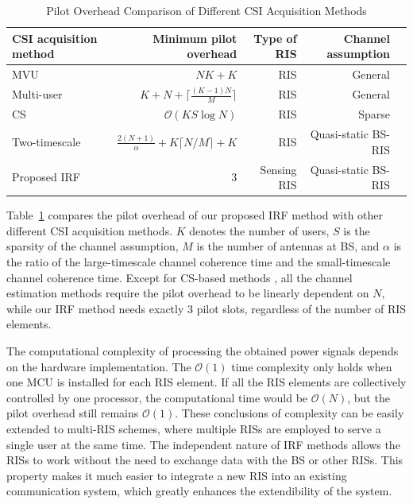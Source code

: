 \documentclass[journal,twocolumn]{IEEEtran}
\theoremstyle{nonumberplain}
\begin{document}
    \begin{table}[t]
        \caption{Pilot Overhead Comparison of Different CSI Acquisition Methods}
        \label{tab:pilot overhead comp CE}
        \centering
        \begin{tabular}{|l|r|r|r|r|}
            \hline 
            CSI acquisition method & Minimum pilot overhead & Type of RIS& Channel assumption\\ 
            \hline
            MVU\cite{jensen2020optimal}         & $NK+K$    &RIS& General  \\
            \hline
            Multi-user\cite{wang2020channel}  & $K+N+ \lceil \frac{(K-1)N}{M} \rceil$ &RIS& General  \\
            \hline
            CS\cite{wei2021channel}          & $\mathcal{O}(KS\log N)$ &RIS& Sparse \\
            \hline 
            Two-timescale\cite{Huchen} & $\frac{2(N+1)}{\alpha} + K\lceil N/M\rceil +K$ &RIS& Quasi-static BS-RIS  \\
            \hline 
            Proposed IRF & 3 & Sensing RIS  & Quasi-static BS-RIS\\ 
            \hline
        \end{tabular}
    \end{table}

    Table~\ref{tab:pilot overhead comp CE} compares the pilot overhead of our proposed IRF method with other different CSI acquisition methods. 
    $K$ denotes the number of users, $S$ is the sparsity of the channel assumption, $M$ is the number of antennas at BS, and $\alpha$ is the ratio of the large-timescale channel  coherence time and the small-timescale channel coherence time\cite{Huchen}. 
    Except for CS-based methods \cite{wei2021channel}, all the channel estimation methods \cite{jensen2020optimal,wang2020channel,Huchen} require the pilot overhead to be linearly dependent on $N$, while our IRF method needs exactly 3 pilot slots, regardless of the number of RIS elements. 

    The computational complexity of processing the obtained power signals depends on the hardware implementation. 
    The $\mathcal{O}(1)$ time complexity only holds when one MCU is installed for each RIS element. 
    If all the RIS elements are collectively controlled by one processor, the computational time would be $\mathcal{O}(N)$, but the pilot overhead still remains $\mathcal{O}(1)$. 
    These conclusions of complexity can be easily extended to multi-RIS schemes, where multiple RISs are employed to serve a single user at the same time. 
    The independent nature of IRF methods allows the RISs to work without the need to exchange data with the BS or other RISs. 
    This property makes it much easier to integrate a new RIS into an existing communication system, which greatly enhances the extendibility of the system.
\end{document}
